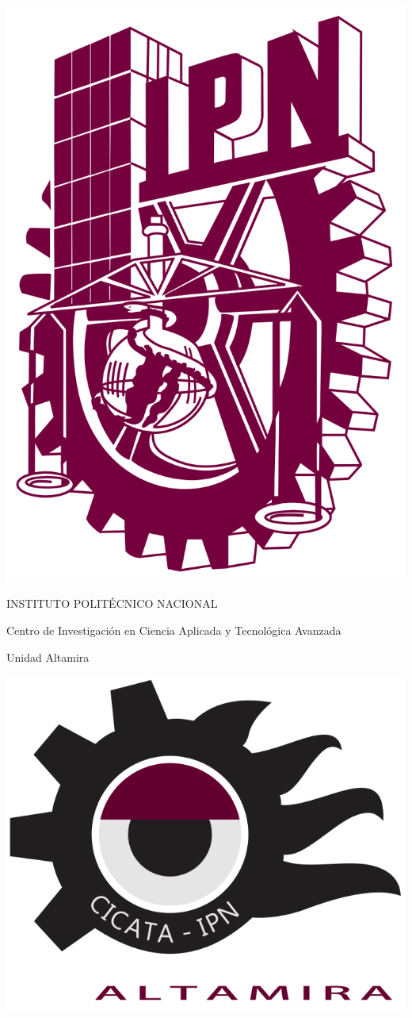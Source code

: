 \begin{titlepage}
    \centering
    
    \begin{minipage}{0.2 \textwidth}
        \centering
        \includegraphics[width=0.7 \textwidth]{src/images/logo_ipn.png}
    \end{minipage}
    \hfill
    \begin{minipage}{0.5\textwidth}
        \centering
        {INSTITUTO POLITÉCNICO NACIONAL \par}
        \vspace{0.3cm}
        {Centro de Investigación en Ciencia Aplicada y Tecnológica Avanzada\par}
        {Unidad Altamira \par}
    \end{minipage}
    \hfill
    \begin{minipage}{0.2 \textwidth}
        \centering
        \includegraphics[width=1 \textwidth]{src/images/CICATAalt.png}

\end{minipage}
\end{titlepage}
